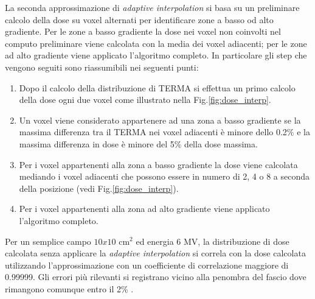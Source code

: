 {La seconda approssimazione di \textit{adaptive interpolation} si basa su un preliminare calcolo della dose su voxel alternati per identificare zone a basso od alto gradiente. Per le zone a basso gradiente la dose nei voxel non coinvolti nel computo preliminare viene calcolata con la media dei voxel adiacenti; per le zone ad alto gradiente viene applicato l'algoritmo completo. In particolare gli step che vengono seguiti sono riassumibili nei seguenti punti:
\begin{enumerate}
\item Dopo il calcolo della distribuzione di TERMA si effettua un primo calcolo della dose ogni due voxel come illustrato nella Fig.\ref{fig:dose_interp}.
\item Un voxel viene considerato appartenere ad una zona a basso gradiente se la massima differenza tra il TERMA nei voxel adiacenti è minore dello 0.2\% e la massima differenza in dose è minore del 5\% della dose massima.
\item Per i voxel appartenenti alla zona a basso gradiente la dose viene calcolata mediando i voxel adiacenti che possono essere in numero di 2, 4 o 8 a seconda della posizione (vedi Fig.\ref{fig:dose_interp}).
\item Per i voxel appartenenti alla zona ad alto gradiente viene applicato l'algoritmo completo.
\end{enumerate}
Per un semplice campo $10x10$ cm$^2$ ed energia 6 MV, la distribuzione di dose calcolata senza applicare la \textit{adaptive interpolation} si correla con la dose calcolata utilizzando l'approssimazione con un coefficiente di correlazione maggiore di 0.99999. Gli errori più rilevanti si registrano vicino alla penombra del fascio dove rimangono comunque entro il 2\% \cite{RaySearchLaboratories2014}.


}

